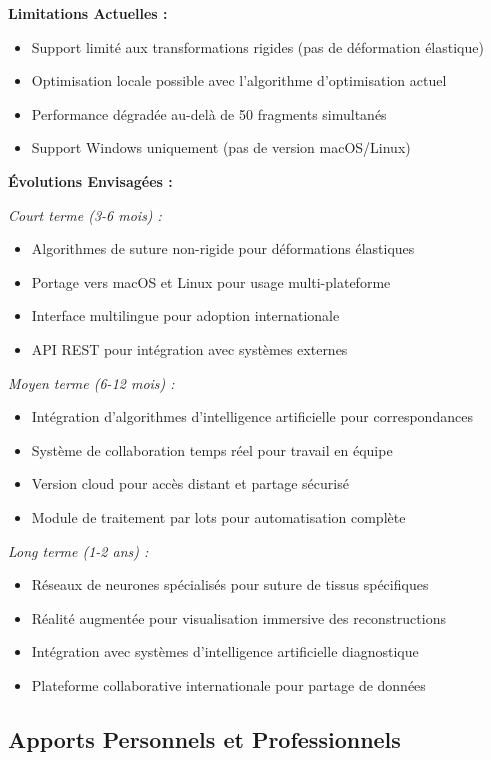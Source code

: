 \documentclass[12pt,a4paper]{article}
\begin{document}
\textbf{Limitations Actuelles :}
\begin{itemize}
\item Support limité aux transformations rigides (pas de déformation élastique)
\item Optimisation locale possible avec l'algorithme d'optimisation actuel
\item Performance dégradée au-delà de 50 fragments simultanés
\item Support Windows uniquement (pas de version macOS/Linux)
\end{itemize}

\textbf{Évolutions Envisagées :}

\textit{Court terme (3-6 mois) :}
\begin{itemize}
\item Algorithmes de suture non-rigide pour déformations élastiques
\item Portage vers macOS et Linux pour usage multi-plateforme
\item Interface multilingue pour adoption internationale
\item API REST pour intégration avec systèmes externes
\end{itemize}

\textit{Moyen terme (6-12 mois) :}
\begin{itemize}
\item Intégration d'algorithmes d'intelligence artificielle pour correspondances
\item Système de collaboration temps réel pour travail en équipe
\item Version cloud pour accès distant et partage sécurisé
\item Module de traitement par lots pour automatisation complète
\end{itemize}

\textit{Long terme (1-2 ans) :}
\begin{itemize}
\item Réseaux de neurones spécialisés pour suture de tissus spécifiques
\item Réalité augmentée pour visualisation immersive des reconstructions
\item Intégration avec systèmes d'intelligence artificielle diagnostique
\item Plateforme collaborative internationale pour partage de données
\end{itemize}

\subsection{Apports Personnels et Professionnels}
\end{document}
